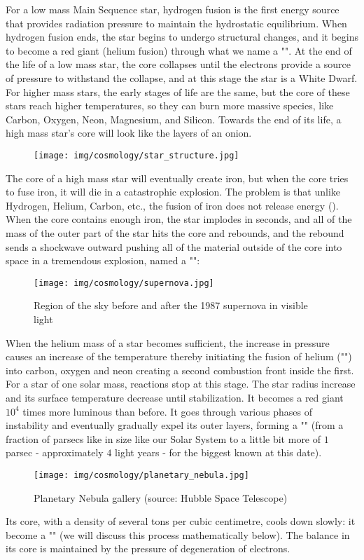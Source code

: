 	For a low mass Main Sequence star, hydrogen fusion is the first energy source that provides radiation pressure to maintain the hydrostatic equilibrium. When hydrogen fusion ends, the star begins to undergo structural changes, and it begins to become a red giant (helium fusion) through what we name a "". At the end of the life of a low mass star, the core collapses until the electrons provide a source of pressure to withstand the collapse, and at this stage the star is a White Dwarf. For higher mass stars, the early stages of life are the same, but the core of these stars reach higher temperatures, so they can burn more massive species, like Carbon, Oxygen, Neon, Magnesium, and Silicon. Towards the end of its life, a high mass star's core will look like the layers of an onion.
	\begin{figure}[H]
		\centering
		\texttt{[image: img/cosmology/star\_structure.jpg]}
	\end{figure}
	The core of a high mass star will eventually create iron, but when the core tries to fuse iron, it will die in a catastrophic explosion. The problem is that unlike Hydrogen, Helium, Carbon, etc., the fusion of iron does not release energy (). When the core contains enough iron, the star implodes in seconds, and all of the mass of the outer part of the star hits the core and rebounds, and the rebound sends a shockwave outward pushing all of the material outside of the core into space in a tremendous explosion, named a "":
	\begin{figure}[H]
		\centering
		\texttt{[image: img/cosmology/supernova.jpg]}
		\caption{Region of the sky before and after the 1987 supernova in visible light}	
	\end{figure}
	When the helium mass of a star becomes sufficient, the increase in pressure causes an increase of the temperature thereby initiating the fusion of helium ("") into carbon, oxygen and neon creating a second combustion front inside the first. For a star of one solar mass, reactions stop at this stage. The star radius increase and its surface temperature decrease until stabilization. It becomes a red giant $10^4$ times more luminous than before. It goes through various phases of instability and eventually gradually expel its outer layers, forming a "" (from a fraction of parsecs like in size like our Solar System to a little bit more of $1$ parsec - approximately $4$ light years - for the biggest known at this date). 
	\begin{figure}[H]
		\centering
		\texttt{[image: img/cosmology/planetary\_nebula.jpg]}	
		\caption[Planetary Nebula gallery]{Planetary Nebula gallery (source: Hubble Space Telescope)}
	\end{figure}
	Its core, with a density of several tons per cubic centimetre, cools down slowly: it become a "" (we will discuss this process mathematically below). The balance in its core is maintained by the pressure of degeneration of electrons.
	
